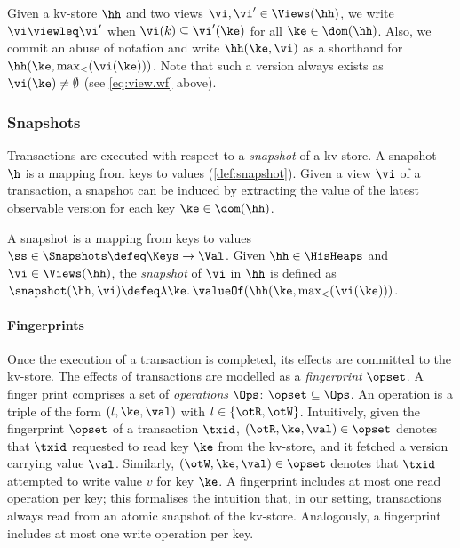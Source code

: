 Given a kv-store $\hh$ and two views $\vi, \vi' \in \Views(\hh)$, 
we write $\vi \viewleq \vi'$ when $\vi(k) \subseteq \vi'(\ke)$ for all $\ke \in \dom(\hh)$. 
Also, we commit an abuse of notation and write $\hh(\ke, \vi)$ as a shorthand 
for $\hh(\ke, \max_{<}(\vi(\ke)))$. 
Note that such a version always exists as
$\vi(\ke) \neq \emptyset$ (see \eqref{eq:view.wf} above).

\subsubsection{Snapshots}
Transactions are executed with respect to a \emph{snapshot} of a kv-store.
A snapshot $\h$ is a mapping from keys to values (\cref{def:snapshot}). 
Given a view $\vi$ of a transaction, a snapshot can be induced 
by extracting the value of the latest observable version for each key $\ke \in \dom(\hh)$. 


\begin{definition}[Snapshots]
\label{def:heaps}
\label{def:snapshot}
A snapshot is a mapping from keys to values \( \ss \in \Snapshots  \defeq \Keys \to \Val\).
Given $\hh \in \HisHeaps$ and $\vi \in \Views(\hh)$, the \emph{snapshot} of $\vi$ in 
$\hh$ is defined as $\snapshot(\hh, \vi) \defeq \lambda \ke \ldotp \valueOf(\hh(\ke, \max_{<}(\vi(\ke)))$.
\end{definition}

\paragraph{Fingerprints}
Once the execution of a transaction is completed, its effects are committed to the kv-store. 
The effects of transactions are modelled as a \emph{fingerprint} $\opset$. 
A finger print comprises a set of \emph{operations} $\Ops$: $\opset \subseteq \Ops$. 
An operation is a triple of the form $(l, \ke, \val)$ with $l \in \{\otR, \otW\}$.    
Intuitively, given the fingerprint $\opset$ of a transaction $\txid$, 
$(\otR, \ke, \val) \in \opset$ denotes that 
$\txid$ requested to read key $\ke$ from the kv-store, 
and it fetched a version carrying value $\val$.
Similarly, $(\otW, \ke, \val) \in \opset$ denotes that 
$\txid$ attempted to write value $v$ for key $\ke$. 
A fingerprint includes at most one read operation per key;
this formalises the intuition that, in our setting, 
transactions always read from an atomic snapshot of the kv-store. 
Analogously, a fingerprint includes at most one write operation per key.

